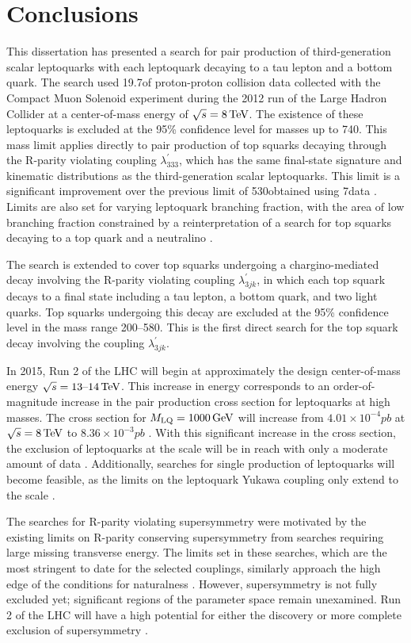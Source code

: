 \chapter{Conclusions
\label{ch:conclusions}}

This dissertation has presented a search for pair production of third-generation scalar leptoquarks with each leptoquark decaying to a tau lepton and a bottom quark. The search used 19.7\fbinv of proton-proton collision data collected with the Compact Muon Solenoid experiment during the 2012 run of the Large Hadron Collider at a center-of-mass energy of $\sqrt{s}=8\,\text{Te\hspace{-.08em}V}$. The existence of these leptoquarks is excluded at the 95\% confidence level for masses up to 740\GeV. This mass limit applies directly to pair production of top squarks decaying through the R-parity violating coupling $\lambda^{\prime}_{333}$, which has the same final-state signature and kinematic distributions as the third-generation scalar leptoquarks. This limit is a significant improvement over the previous limit of 530\GeV obtained using 7\TeV data \cite{CMSLQ3,ATLASLQ3}. Limits are also set for varying leptoquark branching fraction, with the area of low branching fraction constrained by a reinterpretation of a search for top squarks decaying to a top quark and a neutralino \cite{SUS-13-011}. 

The search is extended to cover top squarks undergoing a chargino-mediated decay involving the R-parity violating coupling $\lambda^{\prime}_{3jk}$, in which each top squark decays to a final state including a tau lepton, a bottom quark, and two light quarks. Top squarks undergoing this decay are excluded at the 95\% confidence level in the mass range 200--580\GeV. This is the first direct search for the top squark decay involving the coupling $\lambda^{\prime}_{3jk}$.

In 2015, Run 2 of the LHC will begin at approximately the design center-of-mass energy $\sqrt{s}=13\text{--}14\,\text{Te\hspace{-.08em}V}$. This increase in energy corresponds to an order-of-magnitude increase in the pair production cross section for leptoquarks at high masses. The cross section for $M_{\text{LQ}}=1000\,\text{Ge\hspace{-.08em}V}$ will increase from $4.01\times10^{-4}\unit{pb}$ at $\sqrt{s}=8\,\text{Te\hspace{-.08em}V}$ to $8.36\times10^{-3}\unit{pb}$ \cite{LQxsec}. With this significant increase in the cross section, the exclusion of leptoquarks at the \TeVns scale will be in reach with only a moderate amount of data \cite{LQPairHad}. Additionally, searches for single production of leptoquarks will become feasible, as the limits on the leptoquark Yukawa coupling only extend to the \TeVns scale \cite{Leurer:1993em, MuchAdo, LQreview}.

The searches for R-parity violating supersymmetry were motivated by the existing limits on R-parity conserving supersymmetry from searches requiring large missing transverse energy. The limits set in these searches, which are the most stringent to date for the selected couplings, similarly approach the high edge of the conditions for naturalness \cite{NaturalSUSY}. However, supersymmetry is not fully excluded yet; significant regions of the parameter space remain unexamined. Run 2 of the LHC will have a high potential for either the discovery or more complete exclusion of supersymmetry \cite{CMS:2013xfa}.